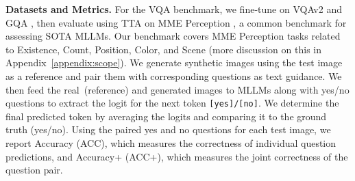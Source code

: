 \textbf{Datasets and Metrics.} For the VQA benchmark, we fine-tune \method on VQAv2 \citep{goyal2017making} and GQA \citep{hudson2019gqa}, then evaluate using TTA on MME Perception \citep{fu2024mme}, a common benchmark for assessing SOTA MLLMs. 
Our benchmark covers MME Perception tasks related to Existence, Count, Position, Color, and Scene (more discussion on this in Appendix~\ref{appendix:scope}).
We generate synthetic images using the test image as a reference and pair them with corresponding questions as text guidance. We then feed the real~(reference) and generated images to MLLMs along with yes/no questions to extract the logit for the next token \texttt{[yes]/[no]}. We determine the final predicted token by averaging the logits and comparing it to the ground truth (yes/no). Using the paired yes and no questions for each test image, we report Accuracy (ACC), which measures the correctness of individual question predictions, and Accuracy+ (ACC+), which measures the joint correctness of the question pair.



